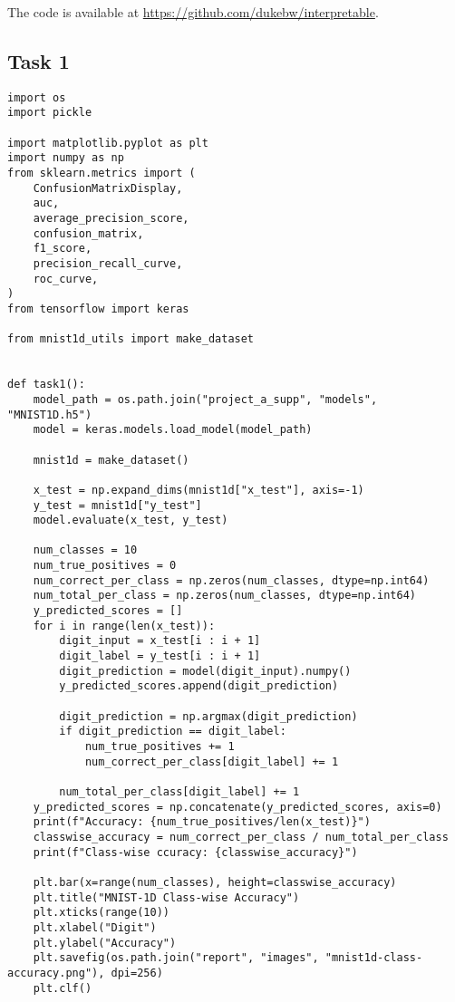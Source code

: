 \documentclass{article}
\begin{document}
The code is available at \url{https://github.com/dukebw/interpretable}.

\subsection{Task 1}
\label{sec:task1-listing}

\begin{lstlisting}
import os
import pickle

import matplotlib.pyplot as plt
import numpy as np
from sklearn.metrics import (
    ConfusionMatrixDisplay,
    auc,
    average_precision_score,
    confusion_matrix,
    f1_score,
    precision_recall_curve,
    roc_curve,
)
from tensorflow import keras

from mnist1d_utils import make_dataset


def task1():
    model_path = os.path.join("project_a_supp", "models", "MNIST1D.h5")
    model = keras.models.load_model(model_path)

    mnist1d = make_dataset()

    x_test = np.expand_dims(mnist1d["x_test"], axis=-1)
    y_test = mnist1d["y_test"]
    model.evaluate(x_test, y_test)

    num_classes = 10
    num_true_positives = 0
    num_correct_per_class = np.zeros(num_classes, dtype=np.int64)
    num_total_per_class = np.zeros(num_classes, dtype=np.int64)
    y_predicted_scores = []
    for i in range(len(x_test)):
        digit_input = x_test[i : i + 1]
        digit_label = y_test[i : i + 1]
        digit_prediction = model(digit_input).numpy()
        y_predicted_scores.append(digit_prediction)

        digit_prediction = np.argmax(digit_prediction)
        if digit_prediction == digit_label:
            num_true_positives += 1
            num_correct_per_class[digit_label] += 1

        num_total_per_class[digit_label] += 1
    y_predicted_scores = np.concatenate(y_predicted_scores, axis=0)
    print(f"Accuracy: {num_true_positives/len(x_test)}")
    classwise_accuracy = num_correct_per_class / num_total_per_class
    print(f"Class-wise ccuracy: {classwise_accuracy}")

    plt.bar(x=range(num_classes), height=classwise_accuracy)
    plt.title("MNIST-1D Class-wise Accuracy")
    plt.xticks(range(10))
    plt.xlabel("Digit")
    plt.ylabel("Accuracy")
    plt.savefig(os.path.join("report", "images", "mnist1d-class-accuracy.png"), dpi=256)
    plt.clf()


\end{lstlisting}
\end{document}
